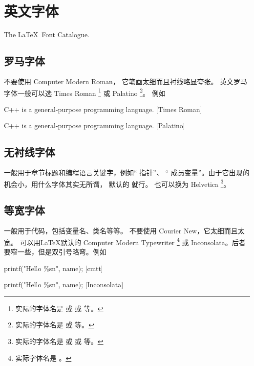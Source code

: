 \section{英文字体} %
The \LaTeX\ Font Catalogue. 

\subsection{罗马字体}
不要使用 {\selectfont Computer Modern Roman}，
它笔画太细而且衬线略显夸张。
英文罗马字体一般可以选 { Times Roman} 
\footnote{实际的字体名是  或  或  等。}
或 { Palatino}
\footnote{实际的字体名是  或  等。}。
例如
\begindot
\item { C++ is a general-purpose programming language. [Times Roman]}
\item { C++ is a general-purpose programming language. [Palatino]}
\myenddot

\subsection{无衬线字体}

一般用于章节标题和编程语言关键字，例如“ 指针”、
“ 成员变量”。由于它出现的机会小，用什么字体其实无所谓，
默认的  就行。
也可以换为 { Helvetica} 
\footnote{实际的字体名是  或  或  等。}。

\subsection{等宽字体}
一般用于代码，包括变量名、类名等等。
不要使用 { Courier New}，它太细而且太宽。
可以用\LaTeX 默认的 { Computer Modern Typewriter}
\footnote{实际字体名是 。} 
或 { Inconsolata}。后者要窄一些，但是双引号略弯。例如
\begindot
\item[] {\small {} printf("Hello \%s\bs n", name);} [cmtt]
\item[] {\small {} printf("Hello \%s\bs n", name);} [Inconsolata]
\myenddot

